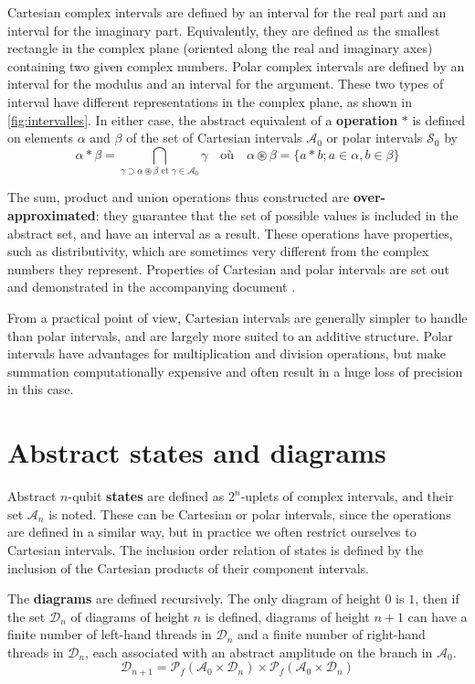 Cartesian complex intervals are defined by an interval for the real part and an interval for the imaginary part. Equivalently, they are defined as the smallest rectangle in the complex plane (oriented along the real and imaginary axes) containing two given complex numbers. Polar complex intervals are defined by an interval for the modulus and an interval for the argument. These two types of interval have different representations in the complex plane, as shown in \autoref{fig:intervalles}. In either case, the abstract equivalent of a \textbf{operation} $*$ is defined on elements $\alpha$ and $\beta$ of the set of Cartesian intervals $\mathcal{A}_0$ or polar intervals $\mathcal S_0$ by
$$\alpha * \beta = \bigcap_{\gamma \supset \alpha \circledast \beta\text{ et }\gamma \in \mathcal{A}_0} \gamma \quad \text{où} \quad \alpha \circledast \beta = \{a * b ; a \in \alpha, b \in \beta\}$$

The sum, product and union operations thus constructed are \textbf{over-approximated}: they guarantee that the set of possible values is included in the abstract set, and have an interval as a result. These operations have properties, such as distributivity, which are sometimes very different from the complex numbers they represent. Properties of Cartesian and polar intervals are set out and demonstrated in the accompanying document \cite{Leroy_2025}.

From a practical point of view, Cartesian intervals are generally simpler to handle than polar intervals, and are largely more suited to an additive structure. Polar intervals have advantages for multiplication and division operations, but make summation computationally expensive and often result in a huge loss of precision in this case.

\section{Abstract states and diagrams}

Abstract $n$-qubit \textbf{states} are defined as $2^n$-uplets of complex intervals, and their set $\mathcal A_n$ is noted.
These can be Cartesian or polar intervals, since the operations are defined in a similar way, but in practice we often restrict ourselves to Cartesian intervals.
The inclusion order relation of states is defined by the inclusion of the Cartesian products of their component intervals.

The \textbf{diagrams} are defined recursively. The only diagram of height 0 is $\boxed 1$, then if the set $\mathcal D_n$ of diagrams of height $n$ is defined, diagrams of height $n+1$ can have a finite number of left-hand threads in $\mathcal D_n$ and a finite number of right-hand threads in $\mathcal D_n$, each associated with an abstract amplitude on the branch in $\mathcal A_0$.
$$\mathcal{D}_{n+1} = \mathscr{P}_f(\mathcal{A}_0 \times \mathcal{D}_n) \times \mathscr{P}_f(\mathcal{A}_0 \times \mathcal{D}_n)$$

